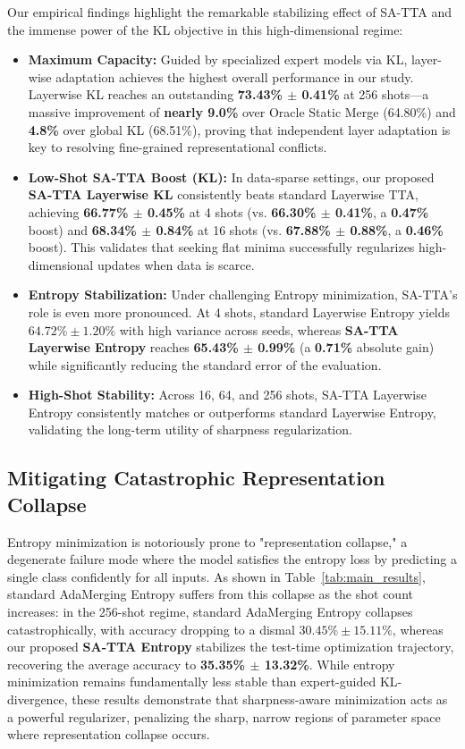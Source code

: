 \documentclass{article}
\theoremstyle{plain}
\theoremstyle{definition}
\theoremstyle{remark}
\begin{document}
Our empirical findings highlight the remarkable stabilizing effect of SA-TTA and the immense power of the KL objective in this high-dimensional regime:
\begin{itemize}
    \item \textbf{Maximum Capacity:} Guided by specialized expert models via KL, layer-wise adaptation achieves the highest overall performance in our study. Layerwise KL reaches an outstanding \textbf{73.43\% $\pm$ 0.41\%} at 256 shots---a massive improvement of \textbf{nearly 9.0\%} over Oracle Static Merge (64.80\%) and \textbf{4.8\%} over global KL (68.51\%), proving that independent layer adaptation is key to resolving fine-grained representational conflicts.
    \item \textbf{Low-Shot SA-TTA Boost (KL):} In data-sparse settings, our proposed \textbf{SA-TTA Layerwise KL} consistently beats standard Layerwise TTA, achieving \textbf{66.77\% $\pm$ 0.45\%} at 4 shots (vs. \textbf{66.30\% $\pm$ 0.41\%}, a \textbf{0.47\%} boost) and \textbf{68.34\% $\pm$ 0.84\%} at 16 shots (vs. \textbf{67.88\% $\pm$ 0.88\%}, a \textbf{0.46\%} boost). This validates that seeking flat minima successfully regularizes high-dimensional updates when data is scarce.
    \item \textbf{Entropy Stabilization:} Under challenging Entropy minimization, SA-TTA's role is even more pronounced. At 4 shots, standard Layerwise Entropy yields $64.72\% \pm 1.20\%$ with high variance across seeds, whereas \textbf{SA-TTA Layerwise Entropy} reaches \textbf{65.43\% $\pm$ 0.99\%} (a \textbf{0.71\%} absolute gain) while significantly reducing the standard error of the evaluation.
    \item \textbf{High-Shot Stability:} Across 16, 64, and 256 shots, SA-TTA Layerwise Entropy consistently matches or outperforms standard Layerwise Entropy, validating the long-term utility of sharpness regularization.
\end{itemize}

\subsection{Mitigating Catastrophic Representation Collapse}
Entropy minimization is notoriously prone to "representation collapse," a degenerate failure mode where the model satisfies the entropy loss by predicting a single class confidently for all inputs. As shown in Table~\ref{tab:main_results}, standard AdaMerging Entropy suffers from this collapse as the shot count increases: in the 256-shot regime, standard AdaMerging Entropy collapses catastrophically, with accuracy dropping to a dismal $30.45\% \pm 15.11\%$, whereas our proposed \textbf{SA-TTA Entropy} stabilizes the test-time optimization trajectory, recovering the average accuracy to \textbf{35.35\% $\pm$ 13.32\%}. While entropy minimization remains fundamentally less stable than expert-guided KL-divergence, these results demonstrate that sharpness-aware minimization acts as a powerful regularizer, penalizing the sharp, narrow regions of parameter space where representation collapse occurs.
\end{document}
